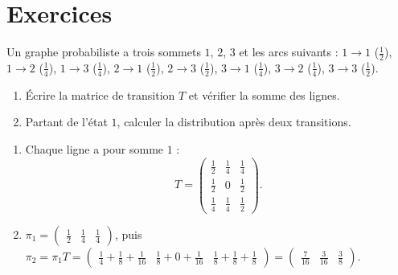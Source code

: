 \section{Exercices}
\begin{exercise}
Un graphe probabiliste a trois sommets $1$, $2$, $3$ et les arcs suivants : $1\to1$ ($\frac12$), $1\to2$ ($\frac14$), $1\to3$ ($\frac14$), $2\to1$ ($\frac12$), $2\to3$ ($\frac12$), $3\to1$ ($\frac14$), $3\to2$ ($\frac14$), $3\to3$ ($\frac12$).
\begin{enumerate}
\item Écrire la matrice de transition $T$ et vérifier la somme des lignes.
\item Partant de l'état $1$, calculer la distribution après deux transitions.
\end{enumerate}
\end{exercise}
\begin{solution}
\begin{enumerate}
\item Chaque ligne a pour somme $1$ : \[T=\begin{pmatrix}\frac12&\frac14&\frac14\\\frac12&0&\frac12\\\frac14&\frac14&\frac12\end{pmatrix}.\]
\item $\pi_1=\begin{pmatrix}\frac12&\frac14&\frac14\end{pmatrix}$, puis $\pi_2=\pi_1T=\begin{pmatrix}\frac14+\frac18+\frac1{16}&\frac18+0+\frac1{16}&\frac18+\frac18+\frac18\end{pmatrix}=\begin{pmatrix}\frac7{16}&\frac3{16}&\frac38\end{pmatrix}$.
\end{enumerate}
\end{solution}


